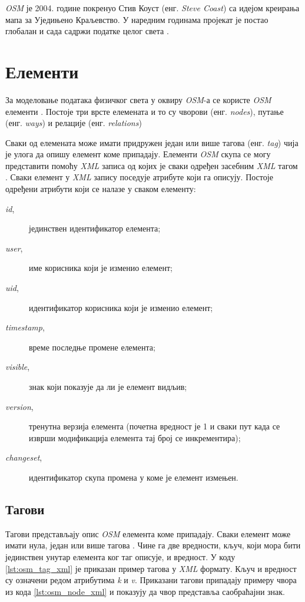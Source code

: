 \documentclass[12pt,oneside]{memoir}
\begin{document}
\textit{OSM} је 2004. године покренуо Стив Коуст (енг. \textit{Steve Coast}) са идејом креирања мапа за Уједињено Краљевство. У наредним годинама пројекат је постао глобалан и сада садржи податке целог света \cite{osm_wiki}.

\section{Елементи}
\label{sec:osm_elementi}

За моделовање података физичког света у оквиру \textit{OSM}-а се користе \textit{OSM} елементи \cite{osm_wiki}. Постоје три врсте елемената и то су чворови (енг. \textit{nodes}), путање (енг. \textit{ways}) и релације (енг. \textit{relations})

Сваки од елемената може имати придружен један или више тагова (енг. \textit{tag}) чија је улога да опишу елемент коме припадају. Елементи \textit{OSM} скупа се могу представити помоћу \textit{XML} записа од којих је сваки одређен засебним \textit{XML} тагом \cite{osm_xml}. Сваки елемент у \textit{XML} запису поседује атрибуте који га описују. Постоје одређени атрибути који се налазе у сваком елементу:

\begin{description}
	\item[\textit{id},] јединствен идентификатор елемента;
	\item[\textit{user},] име корисника који је изменио елемент;
	\item[\textit{uid},] идентификатор корисника који је изменио елемент;
	\item[\textit{timestamp},] време последње промене елемента;
	\item[\textit{visible},] знак који показује да ли је елемент видљив;
	\item[\textit{version},] тренутна верзија елемента (почетна вредност је 1 и сваки пут када се изврши модификација елемента тај број се инкрементира);
	\item[\textit{changeset},] идентификатор скупа промена у коме је елемент измењен.
\end{description}

\subsection{Тагови}
\label{subsec:osm_tags}

Тагови представљају опис \textit{OSM} елемента коме припадају. Сваки елемент може имати нула, један или више тагова \cite{osm_wiki}. Чине га две вредности, кључ, који мора бити јединствен унутар елемента ког таг описује, и вредност. У коду \ref{lst:osm_tag_xml} је приказан пример тагова у \textit{XML} формату. Кључ и вредност су означени редом атрибутима \textit{k} и \textit{v}. Приказани тагови припадају примеру чвора из кода \ref{lst:osm_node_xml} и показују да чвор представља саобраћајни знак.
\end{document}
